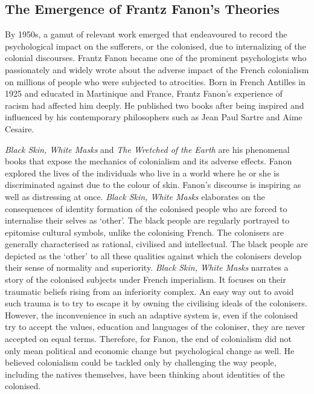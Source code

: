 \subsection{The Emergence of Frantz Fanon’s Theories}

By  1950s,  a  gamut  of  relevant  work  emerged  that  endeavoured  to  record  the  psychological  impact  on  the  sufferers,  or  the  colonised,  due  to  internalizing  of  the  colonial  discourses.    Frantz  Fanon  became  one  of  the  prominent  psychologists  who  passionately  and  widely  wrote  about  the  adverse  impact  of  the  French  colonialism  on  millions  of  people  who  were  subjected  to  atrocities.  Born  in  French  Antilles  in  1925  and  educated  in  Martinique  and  France,  Frantz  Fanon’s  experience  of  racism  had  affected  him  deeply.  He  published  two  books  after  being  inspired  and  influenced  by  his  contemporary  philosophers  such  as  Jean  Paul  Sartre  and  Aime  Cesaire.   

\emph{Black  Skin,  White  Masks}  and  \emph{The  Wretched  of  the  Earth}  are  his  phenomenal  books  that  expose  the  mechanics  of  colonialism  and  its  adverse  effects.  Fanon  explored  the  lives  of  the  individuals  who  live  in  a  world  where  he  or  she  is  discriminated  against  due  to  the  colour  of  skin.  Fanon’s  discourse  is  inspiring  as  well  as  distressing  at  once.  \emph{Black  Skin,  White  Masks}  elaborates  on  the  consequences  of  identity  formation  of  the  colonised  people  who  are  forced  to  internalise  their  selves  as  ‘other’.  The  black  people  are  regularly  portrayed  to  epitomise  cultural  symbols,  unlike  the  colonising  French.  The  colonisers  are  generally  characterised  as  rational,  civilised  and  intellectual.  The  black  people  are  depicted  as  the  ‘other’  to  all  these  qualities  against  which  the  colonisers  develop  their  sense  of  normality  and  superiority.  \emph{Black  Skin,  White  Masks}  narrates  a  story  of  the  colonised  subjects  under  French  imperialism.  It  focuses  on  their  traumatic  beliefs  rising  from  an  inferiority  complex.  An  easy  way  out  to  avoid  such  trauma  is  to  try  to  escape  it  by  owning  the  civilising  ideals  of  the  colonisers.  However,  the  inconvenience  in  such  an  adaptive  system  is,  even  if  the  colonised  try  to  accept  the  values,  education  and  languages  of  the  coloniser,  they  are  never  accepted  on  equal  terms.  Therefore,  for  Fanon,  the  end  of  colonialism  did  not  only  mean  political  and  economic  change  but  psychological  change  as  well.  He  believed  colonialism  could  be  tackled  only  by  challenging  the  way  people,  including  the  natives  themselves,  have  been  thinking  about  identities  of  the  colonised.  